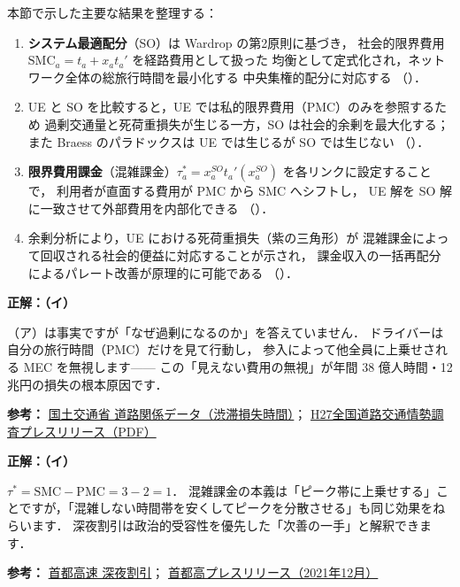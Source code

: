 本節で示した主要な結果を整理する：
\begin{enumerate}
  \item \textbf{システム最適配分}（SO）は Wardrop の第2原則に基づき，
        社会的限界費用 $\mathrm{SMC}_a = t_a + x_a t_a'$ を経路費用として扱った
        均衡として定式化され，ネットワーク全体の総旅行時間を最小化する
        中央集権的配分に対応する
        （）．
  \item UE と SO を比較すると，UE では私的限界費用（PMC）のみを参照するため
        過剰交通量と死荷重損失が生じる一方，SO は社会的余剰を最大化する；
        また Braess のパラドックスは UE では生じるが SO では生じない
        （）．
  \item \textbf{限界費用課金}（混雑課金）$\tau_a^* = x_a^{SO} t_a'(x_a^{SO})$
        を各リンクに設定することで，
        利用者が直面する費用が PMC から SMC へシフトし，
        UE 解を SO 解に一致させて外部費用を内部化できる
        （）．
  \item 余剰分析により，UE における死荷重損失（紫の三角形）が
        混雑課金によって回収される社会的便益に対応することが示され，
        課金収入の一括再配分によるパレート改善が原理的に可能である
        （）．
\end{enumerate}

\begin{example}[title={クイズ 7 正解・解説}]
\label{ans:q7}
\textbf{正解：（イ）}

（ア）は事実ですが「なぜ過剰になるのか」を答えていません．
ドライバーは自分の旅行時間（PMC）だけを見て行動し，
参入によって他全員に上乗せされる MEC を無視します——
この「見えない費用の無視」が年間 38 億人時間・12 兆円の損失の根本原因です．

\noindent\small\textbf{参考：}
\href{https://www.mlit.go.jp/road/ir/ir-data/ir-data.html}{国土交通省 道路関係データ（渋滞損失時間）}；
\href{https://www.mlit.go.jp/report/press/road01_hh_000848.html}{H27全国道路交通情勢調査プレスリリース（PDF）}
\end{example}

\begin{example}[title={クイズ 8 正解・解説}]
\label{ans:q8}
\textbf{正解：（イ）}

$\tau^*=\mathrm{SMC}-\mathrm{PMC}=3-2=1$．
混雑課金の本義は「ピーク帯に上乗せする」ことですが，「混雑しない時間帯を安くしてピークを分散させる」も同じ効果をねらいます．
深夜割引は政治的受容性を優先した「次善の一手」と解釈できます．

\noindent\small\textbf{参考：}
\href{https://www.shutoko.jp/fee/discount/plan_12}{首都高速 深夜割引}；
\href{https://www.shutoko.co.jp/company/press/2021/data/12/10_2022fee/}{首都高プレスリリース（2021年12月）}
\end{example}

